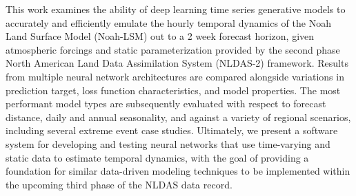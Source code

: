 This work examines the ability of deep learning time series generative models to accurately and efficiently emulate the hourly temporal dynamics of the Noah Land Surface Model (Noah-LSM) out to a 2 week forecast horizon, given atmospheric forcings and static parameterization provided by the second phase North American Land Data Assimilation System (NLDAS-2) framework. Results from multiple neural network architectures are compared alongside variations in prediction target, loss function characteristics, and model properties. The most performant model types are subsequently evaluated with respect to forecast distance, daily and annual seasonality, and against a variety of regional scenarios, including several extreme event case studies. Ultimately, we present a software system for developing and testing neural networks that use time-varying and static data to estimate temporal dynamics, with the goal of providing a foundation for similar data-driven modeling techniques to be implemented within the upcoming third phase of the NLDAS data record.

\clearpage

